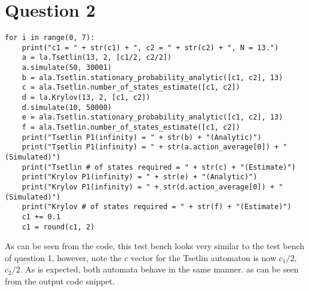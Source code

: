 \documentclass[10pt,english]{article}
\begin{document}
\section{Question 2}
\begin{lstlisting}[label={list:first},caption=testbench for the Krylov 2-action.] 
    for i in range(0, 7):
    print("c1 = " + str(c1) + ", c2 = " + str(c2) + ", N = 13.")
    a = la.Tsetlin(13, 2, [c1/2, c2/2])
    a.simulate(50, 30001)
    b = ala.Tsetlin.stationary_probability_analytic([c1, c2], 13)
    c = ala.Tsetlin.number_of_states_estimate([c1, c2])
    d = la.Krylov(13, 2, [c1, c2])
    d.simulate(10, 50000)
    e = ala.Tsetlin.stationary_probability_analytic([c1, c2], 13)
    f = ala.Tsetlin.number_of_states_estimate([c1, c2])
    print("Tsetlin P1(infinity) = " + str(b) + "(Analytic)")
    print("Tsetlin P1(infinity) = " + str(a.action_average[0]) + "(Simulated)")
    print("Tsetlin # of states required = " + str(c) + "(Estimate)")
    print("Krylov P1(infinity) = " + str(e) + "(Analytic)")
    print("Krylov P1(infinity) = " + str(d.action_average[0]) + "(Simulated)")
    print("Krylov # of states required = " + str(f) + "(Estimate)")
    c1 += 0.1
    c1 = round(c1, 2)
\end{lstlisting}
As can be seen from the code, this test bench looks very similar to the test bench of question 1, however, note the $c$ vector for the Tsetlin automaton is now $c_1 / 2 $, $c_2/2$.  As is expected, both automata behave in the same manner. as can be seen from the output code snippet.
\end{document}
